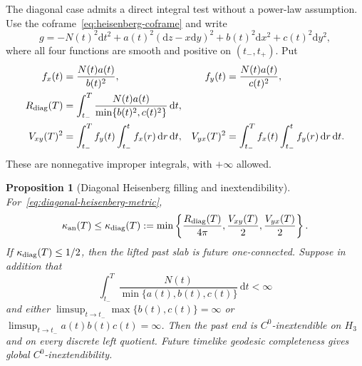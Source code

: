 \documentclass[10pt,a4paper]{article}
\numberwithin{equation}{section}
\newtheorem{proposition}[theorem]{Proposition}
\theoremstyle{definition}
\theoremstyle{remark}
\newcommand{\dd}{\mathrm d}
\begin{document}
The diagonal case admits a direct integral test without a power-law
assumption.  Use the coframe~\eqref{eq:heisenberg-coframe} and write
\begin{equation}
 g=-N(t)^2\dd t^2+a(t)^2(\dd z-x\dd y)^2
                  +b(t)^2\dd x^2+c(t)^2\dd y^2,
 \label{eq:diagonal-heisenberg-metric}
\end{equation}
where all four functions are smooth and positive on $(t_-,t_+)$.  Put
\begin{align}
 f_x(t)&=\frac{N(t)a(t)}{b(t)^2},&
 f_y(t)&=\frac{N(t)a(t)}{c(t)^2},\notag\\
 R_{\rm diag}(T)&=\int_{t_-}^T
                 \frac{N(t)a(t)}{\min\{b(t)^2,c(t)^2\}}\,\dd t,
 \label{eq:diagonal-area-data}\\
 V_{xy}(T)^2&=\int_{t_-}^T f_y(t)
                   \int_{t_-}^t f_x(r)\,\dd r\,\dd t,&
 V_{yx}(T)^2&=\int_{t_-}^T f_x(t)
                   \int_{t_-}^t f_y(r)\,\dd r\,\dd t.\notag
\end{align}
These are nonnegative improper integrals, with $+\infty$ allowed.

\begin{proposition}[Diagonal Heisenberg filling and inextendibility]
\label{prop:diagonal-heisenberg}
For~\eqref{eq:diagonal-heisenberg-metric},
\begin{equation}
 \kappa_{\rm an}(T)\le\kappa_{\rm diag}(T):=
 \min\left\{\frac{R_{\rm diag}(T)}{4\pi},
             \frac{V_{xy}(T)}2,\frac{V_{yx}(T)}2\right\}.
 \label{eq:diagonal-area-bound}
\end{equation}
If $\kappa_{\rm diag}(T)\le1/2$, then the lifted past slab is future
one-connected.  Suppose in addition that
\begin{equation}
 \int_{t_-}^T\frac{N(t)}{\min\{a(t),b(t),c(t)\}}\,\dd t<\infty
 \label{eq:diagonal-cone-test}
\end{equation}
and either $\limsup_{t\to t_-}\max\{b(t),c(t)\}=\infty$ or
$\limsup_{t\to t_-}a(t)b(t)c(t)=\infty$.  Then the past end is
$C^0$-inextendible on $H_3$ and on every discrete left quotient.
Future timelike geodesic completeness gives global
$C^0$-inextendibility.
\end{proposition}
\end{document}
